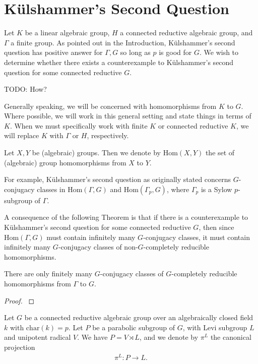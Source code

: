 
\chapter{K\"ulshammer's Second Question}
\label{Chapter4}

Let $K$ be a linear algebraic group, $H$ a connected reductive algebraic group, and $\Gamma$ a finite group.
As pointed out in the Introduction, K\"ulshammer's second question has positive answer for $\Gamma, G$ so long as $p$ is good for $G$. We wish to determine whether there exists a counterexample to K\"ulshammer's second question for some connected reductive $G$.

TODO: How?

Generally speaking, we will be concerned with homomorphisms from $K$ to $G$. Where possible, we will work in this general setting and state things in terms of $K$. When we must specifically work with finite $K$ or connected reductive $K$, we will replace $K$ with $\Gamma$ or $H$, respectively.
\begin{definition} Let $X,Y$ be (algebraic) groups. Then we denote by $\mathrm{Hom}(X, Y)$ the set of (algebraic) group homomorphisms from $X$ to $Y$.
\end{definition}

For example, K\"ulshammer's second question as originally stated concerns $G$-conjugacy classes in $\mathrm{Hom}(\Gamma, G)$ and $\mathrm{Hom}(\Gamma_p, G)$, where $\Gamma_p$ is a Sylow $p$-subgroup of $\Gamma$.

A consequence of the following Theorem  is that if there is a counterexample to K\"ulshammer's second question for some connected reductive $G$, then since $\mathrm{Hom}(\Gamma, G)$ must contain infinitely many $G$-conjugacy classes, it must contain infinitely many $G$-conjugacy classes of non-$G$-completely reducible homomorphisms.

\begin{theorem} \label{thm:finiteGCR} There are only finitely many $G$-conjugacy classes of $G$-completely reducible homomorphisms from $\Gamma$ to $G$.
\end{theorem}
\begin{proof}
\cite[Theorem 1.2]{martin2003reductive}
\end{proof}

Let $G$ be a connected reductive algebraic group over an algebraically closed field $k$ with $\mathrm{char}(k) = p$. Let $P$ be a parabolic subgroup of $G$, with Levi subgroup $L$ and unipotent radical $V$. We have $P = V \rtimes L$, and we denote by $\pi^L$ the canonical projection
\begin{align*} \pi^L:P \rightarrow L. \end{align*}

